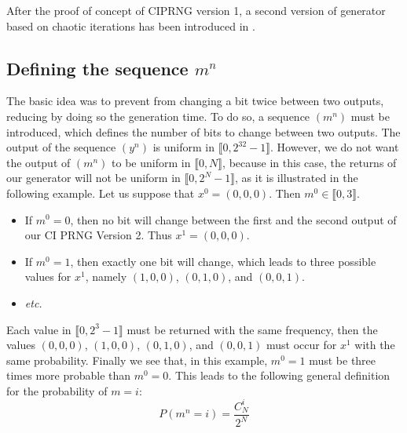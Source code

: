 %
After the proof of concept of CIPRNG version 1, a second version of generator based on chaotic iterations has been introduced in \cite{wbg10:ip}.
\subsection{Defining the sequence $m^n$ }
\label{algo m}
 The basic idea was to prevent from changing a bit twice between two outputs, reducing by doing so the generation time. 
To do so, a sequence $(m^n)$ must be introduced, which defines the number 
of bits to change between two outputs.
The output of the sequence $(y^n)$ is uniform in $\llbracket 0, 2^{32}-1 \rrbracket$. However, we do not want the output of $(m^n)$ to be uniform in $\llbracket 0, N \rrbracket$, because in this case, the returns of our generator will not be uniform in $\llbracket 0, 2^{N}-1 \rrbracket$, as it is illustrated in the following example. Let us suppose that $x^0=(0,0,0)$. Then $m^0 \in \llbracket 0, 3 \rrbracket$. 
\begin{itemize}
\item If $m^0=0$, then no bit will change between the first and the second output of our CI PRNG Version 2. Thus $x^1 = (0,0,0)$.
\item If $m^0=1$, then exactly one bit will change, which leads to three possible values for $x^1$, namely $(1,0,0)$, $(0,1,0)$, and $(0,0,1)$.
\item \emph{etc.}
\end{itemize}
Each value in $\llbracket 0, 2^3-1 \rrbracket$ must be returned with the same frequency, then the values $(0,0,0)$, $(1,0,0)$, $(0,1,0)$, and $(0,0,1)$ must occur for $x^1$ with the same probability. Finally we see that, in this example, $m^0=1$ must be three times more probable than $m^0=0$.
This leads to the following general definition for the probability of $m=i$:
\begin{equation}
P(m^n=i)=\frac{C^i_N}{2^N}
\end{equation}

